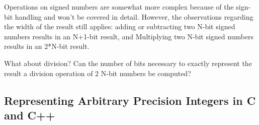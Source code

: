 Operations on signed numbers are somewhat more complex because of the sign-bit handling and won't be covered in detail.  However, the observations regarding the width of the result still applies: adding or subtracting two N-bit signed numbers results in an N+1-bit result, and Multiplying two N-bit signed numbers results in an 2*N-bit result.

\begin{exercise}
What about division?  Can the number of bits necessary to exactly represent the result a division operation of 2 N-bit numbers be computed?
\end{exercise}


\subsection{Representing Arbitrary Precision Integers in C and C++}
\label{sec:arbitrary_precision}

